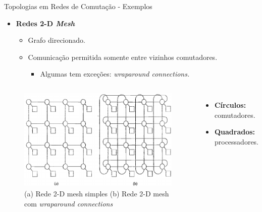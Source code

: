 \begin{frame}{Topologias em Redes de Comutação - Exemplos}
	\begin{itemize}
		\item \textbf{Redes 2-D \textit{Mesh}}
		\bigskip
		\begin{itemize}
			\item Grafo direcionado.
			\medskip
			\item Comunicação permitida somente entre vizinhos comutadores.
			\smallskip
			\begin{itemize}
				\item Algumas tem exceções: \textit{wraparound connections.}
			\end{itemize}
		\end{itemize}
	\end{itemize}
	\begin{columns}
		\hfill
		\begin{figure}[H]
			\centering
			\includegraphics[width=.75\linewidth]{img/redes_de_interconexao/2D-mesh}
			\caption[(a) Rede 2-D mesh simples (b) Rede 2-D mesh com wraparound connections]{(a) Rede 2-D mesh simples (b) Rede 2-D mesh com \textit{wraparound connections}}
			\label{fig:2D-mesh}
		\end{figure}
		\begin{itemize}
			\item \textbf{Círculos:} comutadores.
			\smallskip
			\item \textbf{Quadrados:} processadores.
		\end{itemize}
	\end{columns}
\end{frame}

